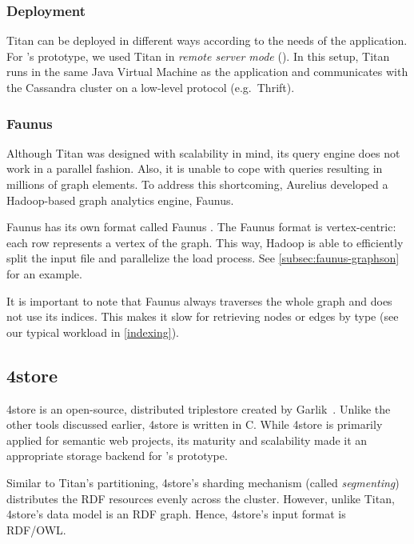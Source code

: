 
\subsubsection{Deployment}

Titan can be deployed in different ways according to the needs of the application. For \iqd's prototype, we used Titan in \textit{remote server mode} (). In this setup, Titan runs in the same Java Virtual Machine as the application and communicates with the Cassandra cluster on a low-level protocol (e.g.\ Thrift).


\subsubsection{Faunus}
\label{subsubsec:faunus}

Although Titan was designed with scalability in mind, its query engine does not work in a parallel fashion. Also, it is unable to cope with queries resulting in millions of graph elements. To address this shortcoming, Aurelius developed a Hadoop-based graph analytics engine, Faunus.

Faunus has its own format called Faunus \graphson{}. The Faunus \graphson{} format is vertex-centric: each row represents a vertex of the graph. This way, Hadoop is able to efficiently split the input file and parallelize the load process. See \autoref{subsec:faunus-graphson} for an example.

It is important to note that Faunus always traverses the whole graph and does not use its indices. This makes it slow for retrieving nodes or edges by type (see our typical workload in \autoref{indexing}).

\subsection{4store}

4store is an open-source, distributed triplestore created by Garlik~\cite{4store}. Unlike the other tools discussed earlier, 4store is written in C. While 4store is primarily applied for semantic web projects, its maturity and scalability made it an appropriate storage backend for \iqd's prototype.

Similar to Titan's partitioning, 4store's sharding mechanism (called \emph{segmenting}) distributes the RDF resources evenly across the cluster. However, unlike Titan, 4store's data model is an RDF graph. Hence, 4store's input format is RDF/OWL.

